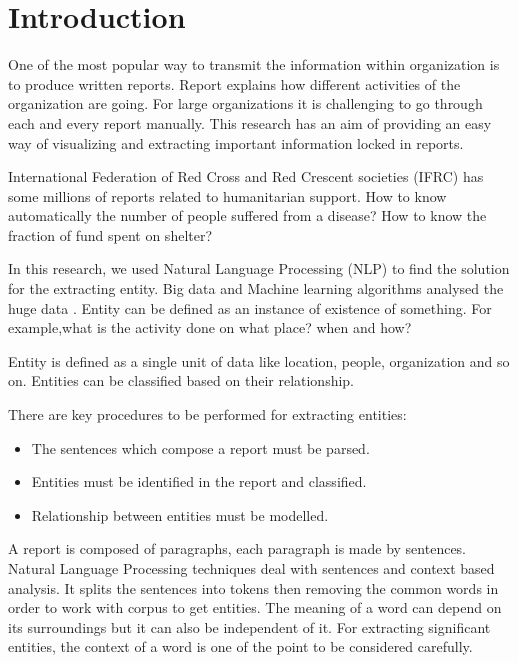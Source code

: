 \chapter{Introduction}
One of the most popular way to transmit the information within organization  is  to produce written reports.  Report explains how different activities of the organization are going. For large organizations it is 
challenging to go through  each and every report manually.
This research has an aim of providing an easy way of visualizing and extracting important information locked in reports.

International Federation of Red Cross and Red Crescent societies (IFRC) has some millions of reports related to humanitarian support.
How to know automatically the number of people suffered from a disease? How to know the fraction of fund spent
on shelter?

In this research, we used Natural Language Processing (NLP) to find the solution for the extracting entity.
Big data and Machine learning algorithms analysed the huge data .
Entity can be defined as an instance of existence of something. For example,what is the activity done on what place?  when and how?

Entity is defined as a single unit of data like location, people, organization and so on. Entities  can be classified based on their relationship.

There are key procedures to be performed for extracting entities: 
\begin{itemize}
\item The sentences which compose a report  must be parsed.
\item Entities must be identified in the report and classified.
\item Relationship between entities must be modelled.
\end{itemize}

A report is composed of paragraphs, each paragraph is made by sentences. Natural  Language Processing techniques deal with sentences and context based analysis. It splits the sentences into tokens
then removing the common words in order to  work with corpus to get entities.
The meaning of a word can depend on its surroundings but it can also be independent of it.
For extracting significant entities, the context of a word is one of the point to be considered carefully.